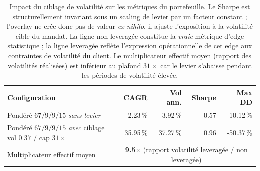 \begin{table}[H]
\centering
\caption{Impact du ciblage de volatilité sur les métriques du portefeuille. Le Sharpe est structurellement invariant sous un scaling de levier par un facteur constant ; l'overlay ne crée donc pas de valeur \emph{ex nihilo}, il ajuste l'exposition à la volatilité cible du mandat. La ligne non leveragée constitue la \emph{vraie} métrique d'edge statistique ; la ligne leveragée reflète l'expression opérationnelle de cet edge aux contraintes de volatilité du client. Le multiplicateur effectif moyen (rapport des volatilités réalisées) est inférieur au plafond $31\times$ car le levier s'abaisse pendant les périodes de volatilité élevée.}
\label{tab:leverage_impact}
\begin{tabular}{lrrrr}
\toprule
Configuration & CAGR & Vol ann. & Sharpe & Max DD \\
\midrule
Pondéré $67/9/9/15$ \emph{sans levier} & 2.23\,\% & 3.92\,\% & 0.57 & -10.12\,\% \\
Pondéré $67/9/9/15$ \emph{avec} ciblage vol $0.37$ / cap $31\times$ & 35.95\,\% & 37.27\,\% & 0.96 & -50.37\,\% \\
Multiplicateur effectif moyen & \multicolumn{4}{c}{\textbf{9.5$\times$} (rapport volatilité leveragée / non leveragée)} \\
\bottomrule
\end{tabular}
\end{table}
